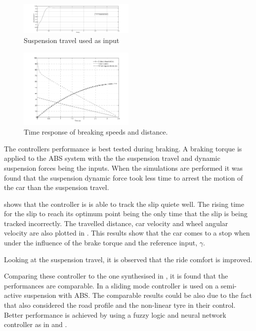 \documentclass[10pt,twocolumn]{witseiepaper}
\begin{document}
\begin{figure}
	\centering
		\includegraphics[width=0.50\textwidth]{suspension_travel.png}
	\caption{Suspension travel used as input}
	\label{fig:suspTravel}
\end{figure}

\begin{figure}
	\centering
		\includegraphics[width=0.50\textwidth]{rho_simulation.png}
	\caption{Time response of breaking speeds and distance.}
	\label{fig:speeds}
\end{figure}

The controllers performance is best tested during braking. A braking torque is applied to the ABS system with the the suspension travel and dynamic suspension forces being the inputs. When the simulations are performed it was found that the suspension dynamic force took less time to arrest the motion of the car than the suspension travel. 

 shows that the controller is is able to track the slip quiete well. The rising time for the slip to reach its optimum point being the only time that the slip is being tracked incorrectly. The travelled distance, car velocity and wheel angular velocity are also plotted in . This results show that the car comes to a stop when under the influence of the brake torque and the reference input, $\gamma$.

Looking at the suspension travel,  it is observed that the ride comfort is improved. 

Comparing these controller to the one synthesised in \cite{Shaomin:2010}, it is found that the performances are comparable. In \cite{Shaomin:2010} a sliding mode controller is used on a semi-active suspension with ABS. The comparable results could be also due to the fact that \cite{Shaomin:2010} also considered the road profile and the non-linear tyre in their control. Better performance is achieved by using a fuzzy logic and neural network controller as in \cite{Wang:2009} and \cite{Tiem:2008}. 
\end{document}
